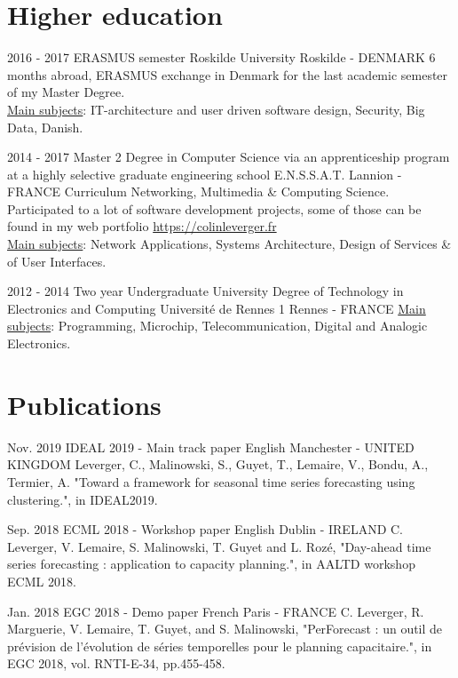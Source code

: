 \documentclass[11pt,a4paper,sans]{moderncv}        %
\begin{document}
\section{Higher education}

\cventry
	{2016 - 2017}
	{ERASMUS semester}
	{Roskilde University}
	{Roskilde - DENMARK}
	{}
	{6 months abroad, ERASMUS exchange in Denmark for the last academic semester of my Master Degree.\\ 
	\underline{Main subjects}: IT-architecture and user driven software design, Security, Big Data, Danish.}  %


\cventry
	{2014 - 2017}
	{Master 2 Degree in Computer Science via an apprenticeship program at a highly selective graduate engineering school}
	{E.N.S.S.A.T.}
	{Lannion - FRANCE}
	{}
	{Curriculum Networking, Multimedia \& Computing Science.\\
	Participated to a lot of software development projects, some of those can be found in my web portfolio \href{https://colinleverger.fr}{https://colinleverger.fr}\\
    \underline{Main subjects}: Network Applications, Systems Architecture, Design of Services \& of User Interfaces.}  %

\cventry
	{2012 - 2014}
    {Two year Undergraduate University Degree of Technology in Electronics and Computing}
    {Université de Rennes 1}
    {Rennes - FRANCE}
    {}
    {\underline{Main subjects}: Programming, Microchip, Telecommunication, Digital and Analogic Electronics.}

\section{Publications}

\cventry
    {Nov. 2019}
    {IDEAL 2019 - Main track paper}
    {English}
    {Manchester - UNITED KINGDOM}
    {}
    {Leverger, C., Malinowski, S., Guyet, T., Lemaire, V., Bondu, A., Termier, A. "Toward a framework for seasonal time series forecasting using clustering.", in IDEAL2019.}

\cventry
    {Sep. 2018}
    {ECML 2018 - Workshop paper}
    {English}
    {Dublin - IRELAND}
    {}
    {C. Leverger, V. Lemaire, S. Malinowski, T. Guyet and L. Rozé, "Day-ahead time series forecasting : application to capacity planning.", in AALTD workshop ECML 2018.}

\cventry
    {Jan. 2018}
    {EGC 2018 - Demo paper}
    {French}
    {Paris - FRANCE}
    {}
    {C. Leverger, R. Marguerie, V. Lemaire, T. Guyet, and S. Malinowski, "PerForecast : un outil de prévision de l'évolution de séries temporelles pour le planning capacitaire.", in EGC 2018, vol. RNTI-E-34, pp.455-458.}
\end{document}
